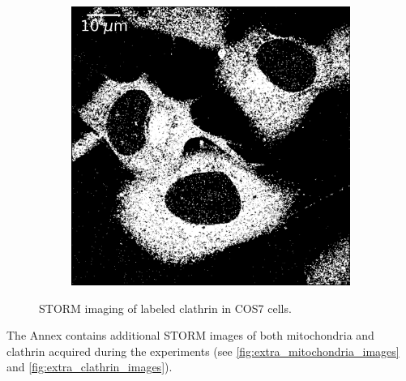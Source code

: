 \begin{figure}
\begin{subfigure}{0.49\textwidth}
        \includegraphics[width=\textwidth]{figures/clathrin_image2.png}
        \caption{}
        \label{fig:clathrin_image6}
    \end{subfigure}
    \caption{STORM imaging of labeled clathrin in COS7 cells.}
    \label{fig:clathrin_images}
\end{figure}

The Annex contains additional STORM images of both mitochondria and clathrin acquired during the experiments (see \autoref{fig:extra_mitochondria_images} and \autoref{fig:extra_clathrin_images}).